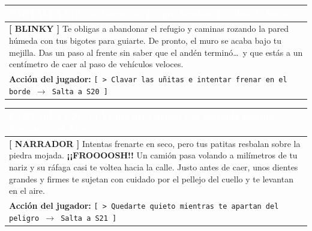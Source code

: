 \documentclass[11pt, a4paper]{article}
\begin{document}
\vspace{1em}

\noindent
\begin{tabularx}{\textwidth}{|X|}
\hline
\rowcolor{colorHeader}
\textbf{\textcolor{white}{PANTALLA S19 $\cdot$ Al Borde del Peligro}} \hfill \small\textcolor{white}{Sentido: Pérdida de Suelo} \\ \hline
\rowcolor{colorTextoBox}
\textbf{\textcolor{colorEmisor}{[ BLINKY ]}} \vspace{0.2em}\newline
Te obligas a abandonar el refugio y caminas rozando la pared húmeda con tus bigotes para guiarte. De pronto, el muro se acaba bajo tu mejilla. Das un paso al frente sin saber que el andén terminó\ldots\ y que estás a un centímetro de caer al paso de vehículos veloces. \\ \hline
\rowcolor{colorBotonBox}
\textbf{Acción del jugador:} \newline
\texttt{[ > Clavar las uñitas e intentar frenar en el borde $\rightarrow$ Salta a S20 ]} \\ \hline
\end{tabularx}

\vspace{1em}

\noindent
\begin{tabularx}{\textwidth}{|X|}
\hline
\rowcolor{colorAlerta}
\textbf{\textcolor{white}{PANTALLA S20 $\cdot$ El Viento del Camión y la Mordida}} \hfill \small\textcolor{white}{Sentido: Rescate en el Aire} \\ \hline
\rowcolor{colorTextoBox}
\textbf{\textcolor{colorAlerta}{[ NARRADOR ]}} \vspace{0.2em}\newline
Intentas frenarte en seco, pero tus patitas resbalan sobre la piedra mojada. \textbf{¡¡FROOOOSH!!} Un camión pasa volando a milímetros de tu nariz y su ráfaga casi te voltea hacia la calle. Justo antes de caer, unos dientes grandes y firmes te sujetan con cuidado por el pellejo del cuello y te levantan en el aire. \\ \hline
\rowcolor{colorBotonBox}
\textbf{Acción del jugador:} \newline
\texttt{[ > Quedarte quieto mientras te apartan del peligro $\rightarrow$ Salta a S21 ]} \\ \hline
\end{tabularx}

\vspace{1em}
\end{document}
